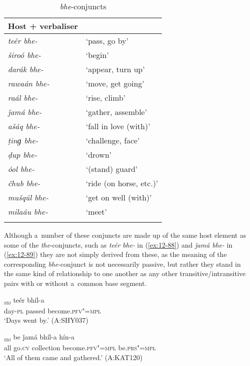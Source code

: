 \begin{table}[ht]
\caption{\textit{bhe}-conjuncts}
\begin{tabularx}{.75\textwidth}{ l@{\hspace{45pt}} Q }
\lsptoprule
Host + verbaliser &
\\\hline
\textit{teér bhe-} &
`pass, go by'\\
\textit{široó bhe-} &
`begin'\\
\textit{darák bhe-} &
`appear, turn up'\\
\textit{rawaán bhe-} &
`move, get going'\\
\textit{raál bhe-} &
`rise, climb'\\
\textit{ǰamá bhe-} &
`gather, assemble'\\
\textit{ašáq bhe-} &
`fall in love (with)'\\
\textit{ṭinɡ bhe-} &
`challenge, face'\\
\textit{ḍup bhe-} &
`drown'\\
\textit{óol bhe-} &
`(stand) guard'\\
\textit{čhub bhe-} &
`ride (on horse, etc.)'\\
\textit{mušqúl bhe-} &
`get on well (with)'\\
\textit{milaáu bhe-} &
`meet'\\\lspbottomrule
\end{tabularx}
\label{tab:12-6}
\end{table}


Although a~number of these conjuncts are made up of the same host element as some of the \textit{the}-conjuncts, such as \textit{teér bhe-} in (\ref{ex:12-88}) and \textit{ǰamá bhe-} in (\ref{ex:12-89}) they are not simply derived from these, as the meaning of the corresponding \textit{bhe}-conjunct is not necessarily passive, but rather they stand in the same kind of relationship to one another as any other transitive/intransitive pairs with or without a~common base segment.

\begin{exe}
\ex
\label{ex:12-88}
\gll [dees-á]\textsubscript{\textsc{sbj}} teér bhíl-a \\
day-\textsc{pl} passed become.\textsc{pfv"=mpl} \\
\glt `Days went by.' (A:SHY037)
\end{exe}
\begin{exe}
\ex
\label{ex:12-89}
\gll [buṭheé]\textsubscript{\textsc{sbj}} be ǰamá bhíl-a hín-a  \\
all go.\textsc{cv} collection become.\textsc{pfv"=mpl} be.\textsc{prs"=mpl} \\
\glt `All of them came and gathered.' (A:KAT120)
\end{exe}

